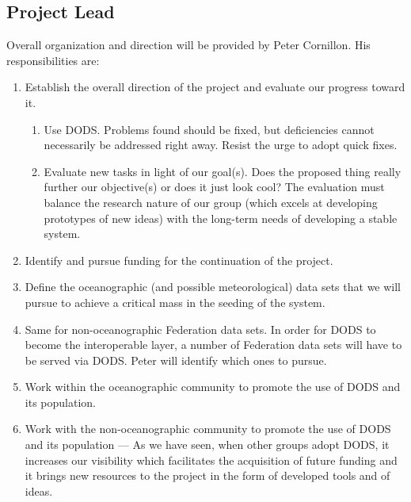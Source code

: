 \documentclass{article}
\begin{document}
\subsection*{Project Lead}
Overall organization and direction will be provided by Peter Cornillon. His
responsibilities are:
\begin{enumerate}

  \item Establish the overall direction of the project and evaluate our 
  progress toward it. 

  \begin{enumerate}
    \item Use DODS. Problems found should be fixed, but deficiencies cannot
    necessarily be addressed right away. Resist the urge to adopt quick fixes.

    \item Evaluate new tasks in light of our goal(s). Does the proposed thing
    really further our objective(s) or does it just look cool? The evaluation
    must balance the research nature of our group (which excels at developing
    prototypes of new ideas) with the long-term needs of developing a stable
    system. 
  \end{enumerate}

  \item Identify and pursue funding for the continuation of the project. 

  \item Define the oceanographic (and possible meteorological) data sets
  that we will pursue to achieve a critical mass in the seeding of the 
  system.

  \item Same for non-oceanographic Federation data sets. In order for
  DODS to become the interoperable layer, a number of Federation data 
  sets will have to be served via DODS. Peter will identify which ones
  to pursue.

  \item Work within the oceanographic community to promote the use of
  DODS and its population.

  \item Work with the non-oceanographic community to promote the use of
  DODS and its population --- As we have seen, when other groups adopt
  DODS, it increases our visibility which facilitates the acquisition 
  of future funding and it brings new resources to the project in the
  form of developed tools and of ideas. 

\end{enumerate}
  
\end{document}
